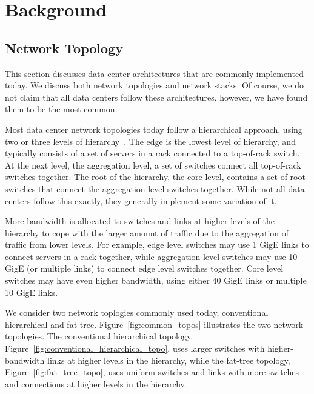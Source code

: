 \vspace{-0.1in}
\section{Background}
\label{sec:background}

\subsection {Network Topology}

This section discusses data center architectures that are commonly implemented today. We discuss both network topologies and network stacks.  Of course, we do not claim that all data centers follow these architectures, however, we have found them to be the most common.



Most data center network topologies today follow a hierarchical approach, using two or three levels of hierarchy~\cite{Al-Fares:2008:SCD}.  The edge is the lowest level of hierarchy, and typically consists of a set of servers in a rack connected to a top-of-rack switch.  At the next level, the aggregation level, a set of switches connect all top-of-rack switches together.  The root of the hierarchy, the core level, contains a set of root switches that connect the aggregation level switches together.  While not all data centers follow this exactly, they generally implement some variation of it.

More bandwidth is allocated to switches and links at higher levels of the hierarchy to cope with the larger amount of traffic due to the aggregation of traffic from lower levels.  For example, edge level switches may use 1 GigE links to connect servers in a rack together, while aggregation level switches may use 10 GigE (or multiple links) to connect edge level switches together.  Core level switches may have even higher bandwidth, using either 40 GigE links or multiple 10 GigE links.

We consider two network toplogies commonly used today, conventional hierarchical and fat-tree.  Figure~\ref{fig:common_topos} illustrates the two network topologies.  The conventional hierarchical topology, Figure~\ref{fig:conventional_hierarchical_topo}, uses larger switches with higher-bandwidth links at higher levels in the hierarchy, while the fat-tree topology, Figure~\ref{fig:fat_tree_topo}, uses uniform switches and links with more switches and connections at higher levels in the hierarchy.


